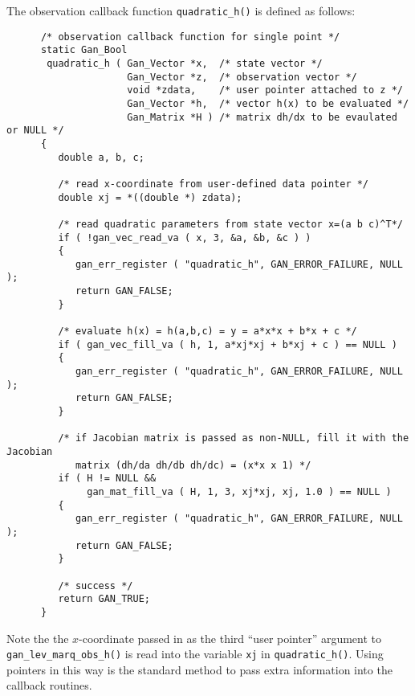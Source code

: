 The observation callback function {\tt quadratic\_h()} is defined as follows:
\begin{verbatim}
      /* observation callback function for single point */
      static Gan_Bool
       quadratic_h ( Gan_Vector *x,  /* state vector */
                     Gan_Vector *z,  /* observation vector */
                     void *zdata,    /* user pointer attached to z */
                     Gan_Vector *h,  /* vector h(x) to be evaluated */
                     Gan_Matrix *H ) /* matrix dh/dx to be evaulated or NULL */
      {
         double a, b, c;

         /* read x-coordinate from user-defined data pointer */
         double xj = *((double *) zdata);

         /* read quadratic parameters from state vector x=(a b c)^T*/
         if ( !gan_vec_read_va ( x, 3, &a, &b, &c ) )
         {
            gan_err_register ( "quadratic_h", GAN_ERROR_FAILURE, NULL );
            return GAN_FALSE;
         }

         /* evaluate h(x) = h(a,b,c) = y = a*x*x + b*x + c */
         if ( gan_vec_fill_va ( h, 1, a*xj*xj + b*xj + c ) == NULL )
         {
            gan_err_register ( "quadratic_h", GAN_ERROR_FAILURE, NULL );
            return GAN_FALSE;
         }

         /* if Jacobian matrix is passed as non-NULL, fill it with the Jacobian
            matrix (dh/da dh/db dh/dc) = (x*x x 1) */
         if ( H != NULL &&
              gan_mat_fill_va ( H, 1, 3, xj*xj, xj, 1.0 ) == NULL )
         {
            gan_err_register ( "quadratic_h", GAN_ERROR_FAILURE, NULL );
            return GAN_FALSE;
         }

         /* success */
         return GAN_TRUE;
      }
\end{verbatim}
Note the the $x$-coordinate passed in as the third ``user pointer'' argument
to {\tt gan\_lev\_marq\_obs\_h()} is read into the variable {\tt xj} in
{\tt quadratic\_h()}. Using pointers in this way is the standard method
to pass extra information into the callback routines.

